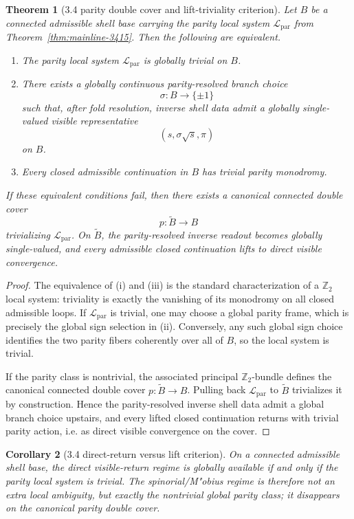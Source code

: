 \documentclass[12pt,a4paper]{article}
\newtheorem{theorem}{Theorem}[section]
\newtheorem{corollary}[theorem]{Corollary}
\begin{document}
\begin{theorem}[3.4 parity double cover and lift-triviality criterion]
\label{thm:mainline-3416}
Let $B$ be a connected admissible shell base carrying the parity local system $\mathcal L_{\mathrm{par}}$ from Theorem~\ref{thm:mainline-3415}. Then the following are equivalent.
\begin{enumerate}[label=(\roman*)]
 \item The parity local system $\mathcal L_{\mathrm{par}}$ is globally trivial on $B$.
 \item There exists a globally continuous parity-resolved branch choice
 \[
 \sigma:B\to\{\pm 1\}
 \]
 such that, after fold resolution, inverse shell data admit a globally single-valued visible representative
 \[
 (s,\sigma\sqrt{s},\pi)
 \]
 on $B$.
 \item Every closed admissible continuation in $B$ has trivial parity monodromy.
\end{enumerate}
If these equivalent conditions fail, then there exists a canonical connected double cover
\[
 p:\widetilde B\to B
\]
trivializing $\mathcal L_{\mathrm{par}}$. On $\widetilde B$, the parity-resolved inverse readout becomes globally single-valued, and every admissible closed continuation lifts to direct visible convergence.
\end{theorem}

\begin{proof}
The equivalence of (i) and (iii) is the standard characterization of a $\mathbb Z_2$ local system: triviality is exactly the vanishing of its monodromy on all closed admissible loops. If $\mathcal L_{\mathrm{par}}$ is trivial, one may choose a global parity frame, which is precisely the global sign selection in (ii). Conversely, any such global sign choice identifies the two parity fibers coherently over all of $B$, so the local system is trivial.

If the parity class is nontrivial, the associated principal $\mathbb Z_2$-bundle defines the canonical connected double cover $p:\widetilde B\to B$. Pulling back $\mathcal L_{\mathrm{par}}$ to $\widetilde B$ trivializes it by construction. Hence the parity-resolved inverse shell data admit a global branch choice upstairs, and every lifted closed continuation returns with trivial parity action, i.e. as direct visible convergence on the cover.
\end{proof}

\begin{corollary}[3.4 direct-return versus lift criterion]
\label{cor:mainline-3416}
On a connected admissible shell base, the direct visible-return regime is globally available if and only if the parity local system is trivial. The spinorial/M"obius regime is therefore not an extra local ambiguity, but exactly the nontrivial global parity class; it disappears on the canonical parity double cover.
\end{corollary}
\end{document}
